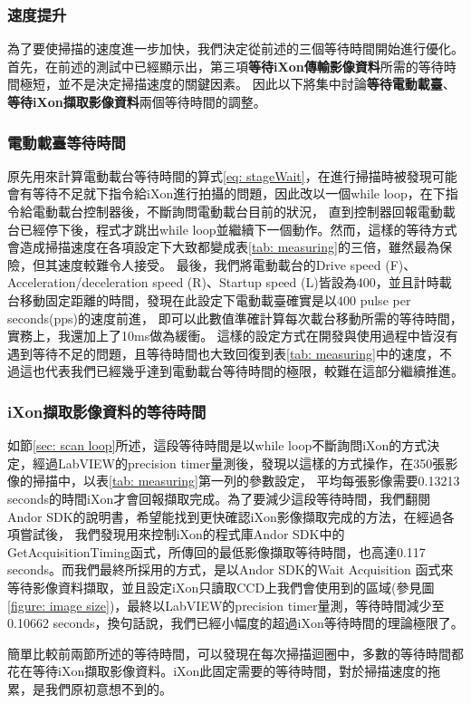 \documentclass[12pt]{article}
\begin{document}
\subsubsection{速度提升}
為了要使掃描的速度進一步加快，我們決定從前述的三個等待時間開始進行優化。首先，在前述的測試中已經顯示出，第三項\textbf{\CJKsans 等待iXon傳輸影像資料}所需的等待時間極短，並不是決定掃描速度的關鍵因素。
因此以下將集中討論\textbf{\CJKsans 等待電動載臺}、\textbf{\CJKsans 等待iXon擷取影像資料}兩個等待時間的調整。
\subsubsection{電動載臺等待時間}
原先用來計算電動載台等待時間的算式\ref{eq: stageWait}，在進行掃描時被發現可能會有等待不足就下指令給iXon進行拍攝的問題，因此改以一個while loop，在下指令給電動載台控制器後，不斷詢問電動載台目前的狀況，
直到控制器回報電動載台已經停下後，程式才跳出while loop並繼續下一個動作。然而，這樣的等待方式會造成掃描速度在各項設定下大致都變成表\ref{tab: measuring}的三倍，雖然最為保險，但其速度較難令人接受。
最後，我們將電動載台的Drive speed (F)、Acceleration/deceleration speed (R)、Startup speed (L)皆設為400，並且計時載台移動固定距離的時間，發現在此設定下電動載臺確實是以400 pulse per seconds(pps)的速度前進，
即可以此數值準確計算每次載台移動所需的等待時間，實務上，我還加上了10ms做為緩衝。
這樣的設定方式在開發與使用過程中皆沒有遇到等待不足的問題，且等待時間也大致回復到表\ref{tab: measuring}中的速度，不過這也代表我們已經幾乎達到電動載台等待時間的極限，較難在這部分繼續推進。
\subsubsection{iXon擷取影像資料的等待時間}
如節\ref{sec: scan loop}所述，這段等待時間是以while loop不斷詢問iXon的方式決定，經過LabVIEW的precision timer量測後，發現以這樣的方式操作，在350張影像的掃描中，以表\ref{tab: measuring}第一列的參數設定，
平均每張影像需要0.13213 seconds的時間iXon才會回報擷取完成。為了要減少這段等待時間，我們翻閱Andor SDK的說明書，希望能找到更快確認iXon影像擷取完成的方法，在經過各項嘗試後，
我們發現用來控制iXon的程式庫Andor SDK中的GetAcquisitionTiming函式，所傳回的最低影像擷取等待時間，也高達0.117 seconds。而我們最終所採用的方式，是以Andor SDK的Wait Acquisition
函式來等待影像資料擷取，並且設定iXon只讀取CCD上我們會使用到的區域(參見圖\ref{figure: image size})，最終以LabVIEW的precision timer量測，等待時間減少至0.10662 seconds，換句話說，我們已經小幅度的超過iXon等待時間的理論極限了。

簡單比較前兩節所述的等待時間，可以發現在每次掃描迴圈中，多數的等待時間都花在等待iXon擷取影像資料。iXon此固定需要的等待時間，對於掃描速度的拖累，是我們原初意想不到的。
\end{document}
